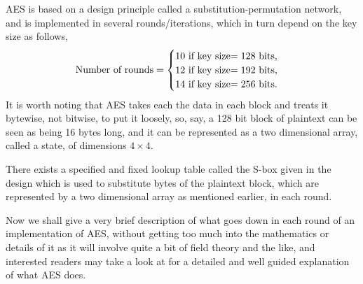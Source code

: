 AES is based on a design principle called a substitution-permutation network, and is implemented in several rounds/iterations, which in turn depend on the key size as follows,
\begin{align*}
    \text{Number of rounds}=\begin{cases}
    10 \text{ if key size$ = 128$ bits,}\\
    12 \text{ if key size$ = 192$ bits,}\\
    14 \text{ if key size$ = 256$ bits.}
    \end{cases}
\end{align*}
It is worth noting that AES takes each the data in each block and treats it bytewise, not bitwise, to put it loosely, so, say, a 128 bit block of plaintext can be seen as being 16 bytes long, and it can be represented as a two dimensional array, called a state, of dimensions $4\times4$.

There exists a specified and fixed lookup table called the S-box given in the design which is used to substitute bytes of the plaintext block, which are represented by a two dimensional array as mentioned earlier, in each round.

Now we shall give a very brief description of what goes down in each round of an implementation of AES, without getting too much into the mathematics or details of it as it will involve quite a bit of field theory and the like, and interested readers may take a look at \cite{RijndaelProp} for a detailed and well guided explanation of what AES does.\\

